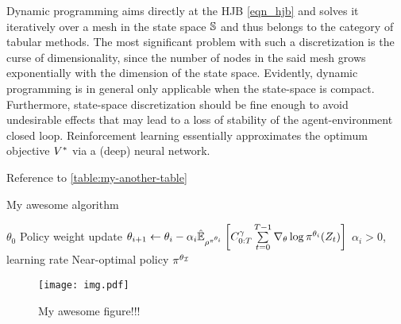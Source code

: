 \documentclass[12pt,twoside]{../../mitthesis}
\begin{document}
Dynamic programming aims directly at the HJB \eqref{eqn_hjb} and solves it iteratively over a mesh in the state space $\states$ and thus belongs to the category of tabular methods.
The most significant problem with such a discretization is the curse of dimensionality, since the number of nodes in the said mesh grows exponentially with the dimension of the state space.
Evidently, dynamic programming is in general only applicable when the state-space is compact.
Furthermore, state-space discretization should be fine enough to avoid undesirable effects that may lead to a loss of stability of the agent-environment closed loop.
Reinforcement learning essentially approximates the optimum objective $\Value^*$ via a (deep) neural network.

Reference to \ref{table:my-another-table}


\begin{algorithm}
\caption{My awesome algorithm}
\label{alg:my-alg}
\begin{algorithmic}
 $\theta_0$
    \STATE Policy weight update
    \STATE $\theta_{i+1} \la \theta_i - \alpha_i \Es[\trajpdf^{\policy^{\theta_i}}]{ \Cost^\gamma_{0:T} \sum \limits_{t=0}^{T-1} \nabla_\theta \log \policy^{\theta_i} ( \Traj_t ) }$
    \STATE $\alpha_i > 0$, learning rate
\ENDFOR
\STATE \RETURN Near-optimal policy $\policy^{\theta_{\mathcal I}}$
\end{algorithmic}
\end{algorithm}

\begin{figure}
    \caption{My awesome figure!!!}
    \label{fig:my-fig}
    \texttt{[image: img.pdf]}
\end{figure}

\printbibliography
%
%
\end{document}
